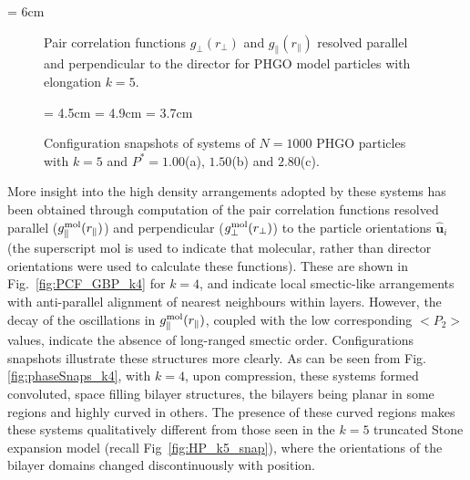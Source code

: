 \documentclass[%
reprint,
superscriptaddress,
showpacs,
 amsmath,amssymb,
 aps,
floatfix,
]{revtex4-1}
\newcommand{\vecth}[1]{ \mathbf{\hat{#1} } }
\newcommand{\pic}[1]{\texttt{[image: \#1]}}
\newcommand{\picL}[1]{\texttt{[image: \#1]}}
\newlength{\picW}
\begin{document}
\picW = 6cm
\begin{figure*}
    \centering
    \subfigure[$g_\parallel(r_\parallel)$]{\picL{GBP_grParallel_k5.ps}}
    \subfigure[$g_\perp(r_\perp)$]{\picL{GBP_grPerpLayer_k5.ps}}
    \caption{Pair correlation functions $g_\perp(r_\perp)$ and
    $g_\parallel(r_\parallel)$ resolved parallel and perpendicular to the director
    for PHGO model particles with elongation $k=5$.}
    \label{fig:PCF_GBP_k5}
\end{figure*}

\begin{figure*}
    \centering
    \picW = 4.5cm
    \subfigure[isotropic]{\pic{GBP_box_k5_iso.ps}}
    \picW = 4.9cm
    \subfigure[nematic]{\pic{GBP_box_k5_nem.ps}}
    \picW = 3.7cm
    \subfigure[smectic]{\pic{GBP_box_k5_smA.ps}}
    \caption{Configuration snapshots of systems of $N=1000$ PHGO particles with $k=5$ and
    $P^{*}=1.00$(a), $1.50$(b) and $2.80$(c).}
    \label{fig:phaseSnaps_k5}
\end{figure*}


More insight into the high density arrangements adopted by these systems has been obtained
through computation of the pair correlation functions resolved parallel
($g^{\rm mol}_\parallel(r_\parallel)$) and perpendicular ($g^{\rm mol}_\perp(r_\perp)$) to the
particle orientations $\vecth{u}_i$ (the superscript mol is used to indicate that molecular,
rather than director orientations were used to calculate these functions). These are shown in
Fig.~\ref{fig:PCF_GBP_k4} for $k=4$, and indicate local smectic-like arrangements with anti-parallel
alignment of nearest neighbours within layers. However, the decay of the oscillations in $g^{\rm
mol}_\parallel(r_\parallel)$, coupled with the low corresponding $<P_2>$ values, indicate the
absence of long-ranged smectic order. Configurations snapshots illustrate these structures more
clearly. As can be seen from Fig.\ref{fig:phaseSnaps_k4}, with $k=4$, upon
compression, these systems formed convoluted, space filling bilayer structures, the bilayers
being planar in some regions and highly curved in others. The presence of these curved regions
makes these systems qualitatively different from those seen in the $k=5$ truncated Stone expansion model
(recall Fig~\ref{fig:HP_k5_snap}), where the orientations of the bilayer domains changed
discontinuously with position.
\end{document}
